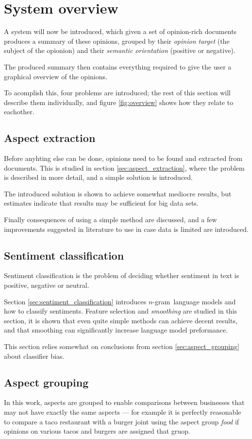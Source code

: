 \documentclass[a4paper,11pt]{kth-mag}
\newcommand{\ngram}{$n$-gram}
\begin{document}
\section{System overview}
A system will now be introduced, which given a set of opinion-rich documents produces a summary of these
opinions, grouped by their \emph{opinion target} (the subject of the opionion)
and their \emph{semantic orientation} (positive or negative).

The produced summary then contains everything required to give the user a graphical overview of the opinions.

To acomplish this, four problems are introduced; the rest of this section will describe them individually, and figure \ref{fig:overview} shows
how they relate to eachother.


\subsection{Aspect extraction}
Before anyhting else can be done, opinions need to be found and extracted from documents.
This is studied in section \ref{sec:aspect_extraction}, where the problem is described in more detail,
and a simple solution is introduced.

The introduced solution is shown to achieve somewhat mediocre results, but estimates indicate
that results may be sufficient for big data sets.

Finally consequences of using a simple method are discussed, and a few improvements suggested in literature
to use in case data is limited are introduced.


\subsection{Sentiment classification}
Sentiment classification is the problem of deciding whether sentiment in text is positive, negative or neutral.

Section \ref{sec:sentiment_classification} introduces \ngram~language models and how to classify sentiments.
Feature selection and \emph{smoothing} are studied in this section, it is shown that even quite simple methods can
achieve decent results, and that smoothing can significantly increase language model preformance.

This section relies somewhat on conclusions from section \ref{sec:aspect_grouping} about classifier bias.

\subsection{Aspect grouping}
In this work, aspects are grouped to enable comparisons between businesses that may not have exactly the same aspects ---
for example it is perfectly reasonable to compare a taco restaurant with a burger joint using the aspect group \emph{food}
if opinions on various tacos and burgers are assigned that gruop.
\end{document}
